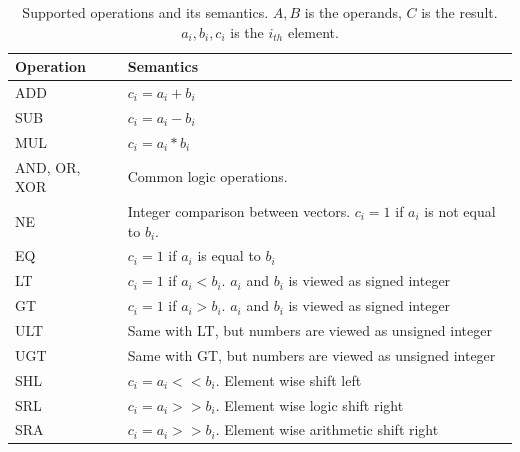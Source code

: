 \begin{table}
  \begin{center}
    \begin{tabular}{|l|l|}
      \hline
      Operation & Semantics \\ \hline
      ADD & $c_i = a_i + b_i$ \\\hline
      SUB & $c_i = a_i - b_i$ \\\hline
      MUL & $c_i = a_i * b_i$ \\\hline
      AND, OR, XOR & Common logic operations. \\\hline
      NE        & Integer comparison between vectors. $c_i = 1$ if $a_i$ is not equal to $b_i$.    \\ \hline
      EQ        & $c_i = 1$ if $a_i$ is equal to $b_i$                                  \\ \hline
      LT        & $c_i = 1$ if $a_i < b_i$. $a_i$ and $b_i$ is viewed as signed integer \\ \hline
      GT        & $c_i = 1$ if $a_i > b_i$. $a_i$ and $b_i$ is viewed as signed integer \\ \hline
      ULT       & Same with LT, but numbers are viewed as unsigned integer              \\ \hline
      UGT       & Same with GT, but numbers are viewed as unsigned integer              \\ \hline
      SHL       & $c_i = a_i << b_i$. Element wise shift left                            \\ \hline
      SRL       & $c_i = a_i >> b_i$. Element wise logic shift right                     \\ \hline
      SRA       & $c_i = a_i >> b_i$. Element wise arithmetic shift right                \\ \hline
    \end{tabular}
  \end{center}
  \caption[Supported operations and its semantics.]{Supported operations and its semantics. $A, B$ is the operands, $C$ is the result. $a_i, b_i, c_i$ is the $i_{th}$ element.}
  \label{table:semantics}
\end{table}

